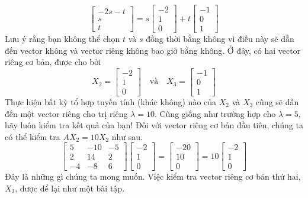 \begin{equation*}
\begin{bmatrix}-2s-t\\ s\\ t\end{bmatrix}=s\begin{bmatrix}-2\\ 1\\ 0\end{bmatrix}+t\begin{bmatrix}-1\\ 0\\ 1\end{bmatrix}
\end{equation*}
Lưu ý rằng bạn không thể chọn $t$ và $s$ đồng thời bằng không vì điều này sẽ dẫn đến vector không và vector riêng không bao giờ bằng không.
Ở đây, có hai vector riêng cơ bản, được cho bởi
\begin{equation*}
X_{2}=\begin{bmatrix}-2\\ 1\\ 0\end{bmatrix} \quad \text{và} \quad X_{3}=\begin{bmatrix}-1\\ 0\\ 1\end{bmatrix}
\end{equation*}
Thực hiện bất kỳ tổ hợp tuyến tính (khác không) nào của $X_{2}$ và $X_{3}$ cũng sẽ dẫn đến một vector riêng cho trị riêng $\lambda=10$. Cũng giống như trường hợp cho $\lambda=5$, hãy luôn kiểm tra kết quả của bạn! Đối với vector riêng cơ bản đầu tiên, chúng ta có thể kiểm tra $AX_{2}=10X_{2}$ như sau.
\begin{equation*}
\begin{bmatrix}5&-10&-5\\ 2&14&2\\ -4&-8&6\end{bmatrix}\begin{bmatrix}-2\\ 1\\ 0\end{bmatrix}=\begin{bmatrix}-20\\ 10\\ 0\end{bmatrix}=10\begin{bmatrix}-2\\ 1\\ 0\end{bmatrix}
\end{equation*}
Đây là những gì chúng ta mong muốn. Việc kiểm tra vector riêng cơ bản thứ hai, $X_{3}$, được để lại như một bài tập.

